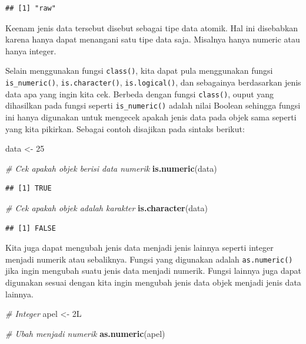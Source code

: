 \documentclass[
]{book}
\newenvironment{Shaded}{\begin{snugshade}}{\end{snugshade}}
\newcommand{\CommentTok}[1]{\textcolor[rgb]{0.56,0.35,0.01}{\textit{#1}}}
\newcommand{\DecValTok}[1]{\textcolor[rgb]{0.00,0.00,0.81}{#1}}
\newcommand{\FunctionTok}[1]{\textcolor[rgb]{0.13,0.29,0.53}{\textbf{#1}}}
\newcommand{\NormalTok}[1]{#1}
\newcommand{\OtherTok}[1]{\textcolor[rgb]{0.56,0.35,0.01}{#1}}
\theoremstyle{definition}
\theoremstyle{definition}
\theoremstyle{definition}
\theoremstyle{definition}
\theoremstyle{remark}
\begin{document}
\begin{verbatim}
## [1] "raw"
\end{verbatim}

Keenam jenis data tersebut disebut sebagai tipe data atomik. Hal ini disebabkan karena hanya dapat menangani satu tipe data saja. Misalnya hanya numeric atau hanya integer.

Selain menggunakan fungsi \texttt{class()}, kita dapat pula menggunakan fungsi \texttt{is\_numeric()}, \texttt{is.character()}, \texttt{is.logical()}, dan sebagainya berdasarkan jenis data apa yang ingin kita cek. Berbeda dengan fungsi \texttt{class()}, ouput yang dihasilkan pada fungsi seperti \texttt{is\_numeric()} adalah nilai Boolean sehingga fungsi ini hanya digunakan untuk mengecek apakah jenis data pada objek sama seperti yang kita pikirkan. Sebagai contoh disajikan pada sintaks berikut:

\begin{Shaded}
\begin{Highlighting}[]
\NormalTok{data }\OtherTok{\textless{}{-}} \DecValTok{25}

\CommentTok{\# Cek apakah objek berisi data numerik}
\FunctionTok{is.numeric}\NormalTok{(data)}
\end{Highlighting}
\end{Shaded}

\begin{verbatim}
## [1] TRUE
\end{verbatim}

\begin{Shaded}
\begin{Highlighting}[]
\CommentTok{\# Cek apakah objek adalah karakter}
\FunctionTok{is.character}\NormalTok{(data)}
\end{Highlighting}
\end{Shaded}

\begin{verbatim}
## [1] FALSE
\end{verbatim}

Kita juga dapat mengubah jenis data menjadi jenis lainnya seperti integer menjadi numerik atau sebaliknya. Fungsi yang digunakan adalah \texttt{as.numeric()} jika ingin mengubah suatu jenis data menjadi numerik. Fungsi lainnya juga dapat digunakan sesuai dengan kita ingin mengubah jenis data objek menjadi jenis data lainnya.

\begin{Shaded}
\begin{Highlighting}[]
\CommentTok{\# Integer}
\NormalTok{apel }\OtherTok{\textless{}{-}}\NormalTok{ 2L}

\CommentTok{\# Ubah menjadi numerik}
\FunctionTok{as.numeric}\NormalTok{(apel)}
\end{Highlighting}
\end{Shaded}
\end{document}
